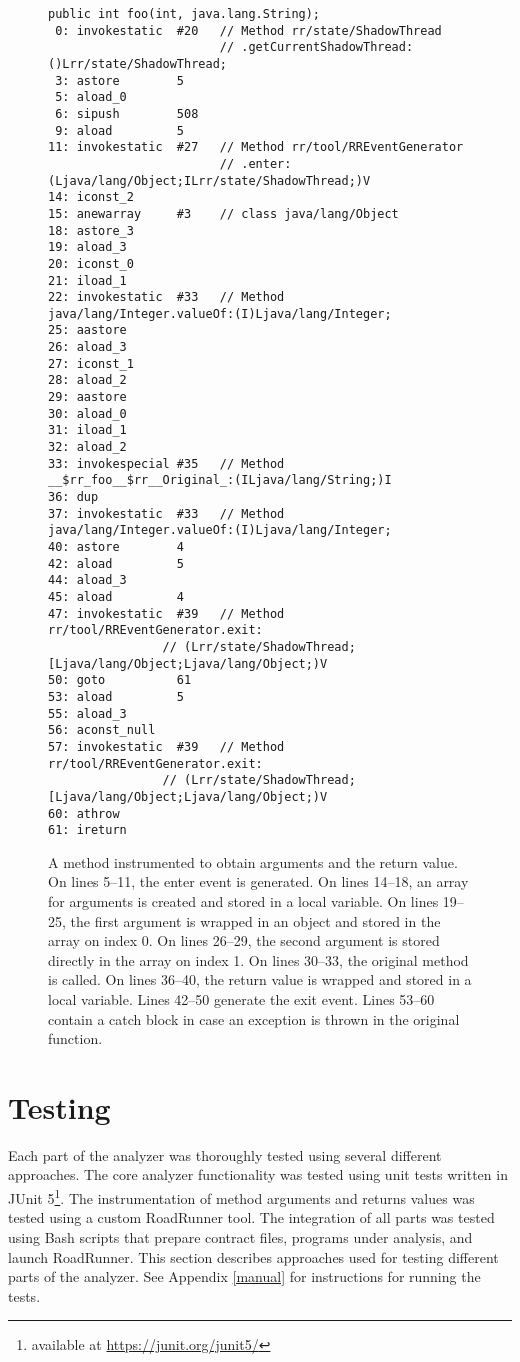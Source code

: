 \begin{figure}[hbt]
    \label{paramInst}
    \begin{lstlisting}
public int foo(int, java.lang.String);
 0: invokestatic  #20   // Method rr/state/ShadowThread
                        // .getCurrentShadowThread:()Lrr/state/ShadowThread;
 3: astore        5
 5: aload_0
 6: sipush        508
 9: aload         5
11: invokestatic  #27   // Method rr/tool/RREventGenerator
                        // .enter:(Ljava/lang/Object;ILrr/state/ShadowThread;)V
14: iconst_2
15: anewarray     #3    // class java/lang/Object
18: astore_3
19: aload_3
20: iconst_0
21: iload_1
22: invokestatic  #33   // Method java/lang/Integer.valueOf:(I)Ljava/lang/Integer;
25: aastore
26: aload_3
27: iconst_1
28: aload_2
29: aastore
30: aload_0
31: iload_1
32: aload_2
33: invokespecial #35   // Method __$rr_foo__$rr__Original_:(ILjava/lang/String;)I
36: dup
37: invokestatic  #33   // Method java/lang/Integer.valueOf:(I)Ljava/lang/Integer;
40: astore        4
42: aload         5
44: aload_3
45: aload         4
47: invokestatic  #39   // Method rr/tool/RREventGenerator.exit:
                // (Lrr/state/ShadowThread;[Ljava/lang/Object;Ljava/lang/Object;)V
50: goto          61
53: aload         5
55: aload_3
56: aconst_null
57: invokestatic  #39   // Method rr/tool/RREventGenerator.exit:
                // (Lrr/state/ShadowThread;[Ljava/lang/Object;Ljava/lang/Object;)V
60: athrow
61: ireturn\end{lstlisting}
    \caption{A method instrumented to obtain arguments and the return value. On
    lines 5--11, the enter event is generated. On lines 14--18, an array for
    arguments is created and stored in a local variable. On lines 19--25, the
    first argument is wrapped in an object and stored in the array on index 0.
    On lines 26--29, the second argument is stored directly in the array on
    index 1. On lines 30--33, the original method is called. On lines 36--40,
    the return value is wrapped and stored in a local variable. Lines 42--50
    generate the exit event. Lines 53--60 contain a catch block in case an
    exception is thrown in the original function.}
\end{figure}

\section{Testing}
\label{testing}

Each part of the analyzer was thoroughly tested using several different
approaches. The core analyzer functionality was tested using unit tests written
in JUnit 5\footnote{available at \url{https://junit.org/junit5/}}. The
instrumentation of method arguments and returns values was tested using a custom
RoadRunner tool. The integration of all parts was tested using Bash scripts that
prepare contract files, programs under analysis, and launch RoadRunner. This
section describes approaches used for testing different parts of the analyzer.
See Appendix \ref{manual} for instructions for running the tests.

